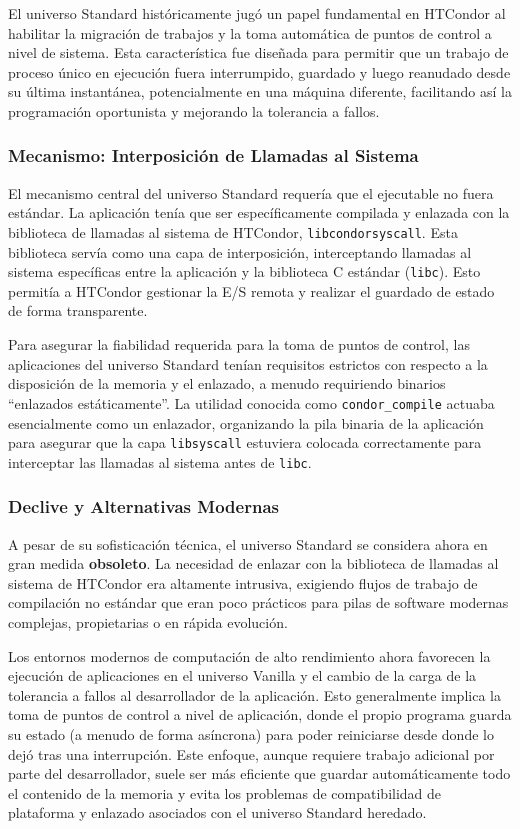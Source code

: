 El universo Standard históricamente jugó un papel fundamental en HTCondor al habilitar la migración de trabajos y la toma automática de puntos de control a nivel de sistema. Esta característica fue diseñada para permitir que un trabajo de proceso único en ejecución fuera interrumpido, guardado y luego reanudado desde su última instantánea, potencialmente en una máquina diferente, facilitando así la programación oportunista y mejorando la tolerancia a fallos.

\subsubsection{Mecanismo: Interposición de Llamadas al Sistema}

El mecanismo central del universo Standard requería que el ejecutable no fuera estándar. La aplicación tenía que ser específicamente compilada y enlazada con la biblioteca de llamadas al sistema de HTCondor, \texttt{libcondorsyscall}. Esta biblioteca servía como una capa de interposición, interceptando llamadas al sistema específicas entre la aplicación y la biblioteca C estándar (\texttt{libc}). Esto permitía a HTCondor gestionar la E/S remota y realizar el guardado de estado de forma transparente.

Para asegurar la fiabilidad requerida para la toma de puntos de control, las aplicaciones del universo Standard tenían requisitos estrictos con respecto a la disposición de la memoria y el enlazado, a menudo requiriendo binarios ``enlazados estáticamente''. La utilidad conocida como \texttt{condor\_compile} actuaba esencialmente como un enlazador, organizando la pila binaria de la aplicación para asegurar que la capa \texttt{libsyscall} estuviera colocada correctamente para interceptar las llamadas al sistema antes de \texttt{libc}.

\subsubsection{Declive y Alternativas Modernas}

A pesar de su sofisticación técnica, el universo Standard se considera ahora en gran medida \textbf{obsoleto}. La necesidad de enlazar con la biblioteca de llamadas al sistema de HTCondor era altamente intrusiva, exigiendo flujos de trabajo de compilación no estándar que eran poco prácticos para pilas de software modernas complejas, propietarias o en rápida evolución.

Los entornos modernos de computación de alto rendimiento ahora favorecen la ejecución de aplicaciones en el universo Vanilla y el cambio de la carga de la tolerancia a fallos al desarrollador de la aplicación. Esto generalmente implica la toma de puntos de control a nivel de aplicación, donde el propio programa guarda su estado (a menudo de forma asíncrona) para poder reiniciarse desde donde lo dejó tras una interrupción. Este enfoque, aunque requiere trabajo adicional por parte del desarrollador, suele ser más eficiente que guardar automáticamente todo el contenido de la memoria y evita los problemas de compatibilidad de plataforma y enlazado asociados con el universo Standard heredado.

